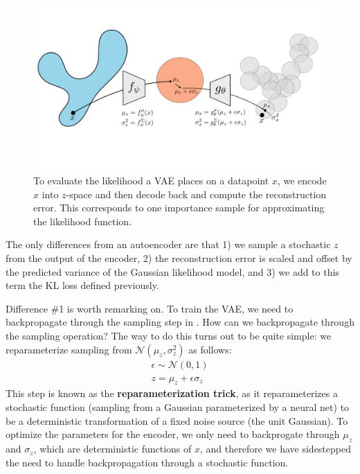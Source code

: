 \begin{figure}[h!]
    \centerline{
    \includegraphics[width=0.8\linewidth]{./figures/generative_modeling_and_representation_learning/VAE_as_autoencoder.pdf}
    }
    \caption{To evaluate the likelihood a VAE places on a datapoint $x$, we encode $x$ into $z$-space and then decode back and compute the reconstruction error. This corresponds to one importance sample for approximating the likelihood function.}
\label{fig:generative_modeling_and_representation_learning:VAE_as_autoencoder}
\end{figure}

The only differences from an autoencoder are that 1) we sample a stochastic $z$ from the output of the encoder, 2) the reconstruction error is scaled and offset by the predicted variance of the Gaussian likelihood model, and 3) we add to this term the KL loss defined previously.

Difference \#1 is worth remarking on. To train the VAE, we need to backpropagate through the sampling step in \eqn{\ref{eqn:generative_modeling_meets_representation_learning:sampling_z_step}}. How can we backpropagate through the sampling operation? The way to do this turns out to be quite simple: we reparameterize sampling from $\mathcal{N}(\mu_z, \sigma^2_z)$ as follows:
\begin{align}
    \epsilon \sim \mathcal{N}(0,1)\\
    z = \mu_z + \epsilon \sigma_z
\end{align}
This step is known as the \textbf{reparameterization trick}, as it reparameterizes a stochastic function (sampling from a Gaussian parameterized by a neural net) to be a deterministic transformation of a fixed noise source (the unit Gaussian). To optimize the parameters for the encoder, we only need to backprogate through $\mu_z$ and $\sigma_z$, which are deterministic functions of $x$, and therefore we have sidestepped the need to handle backpropagation through a stochastic function.%

